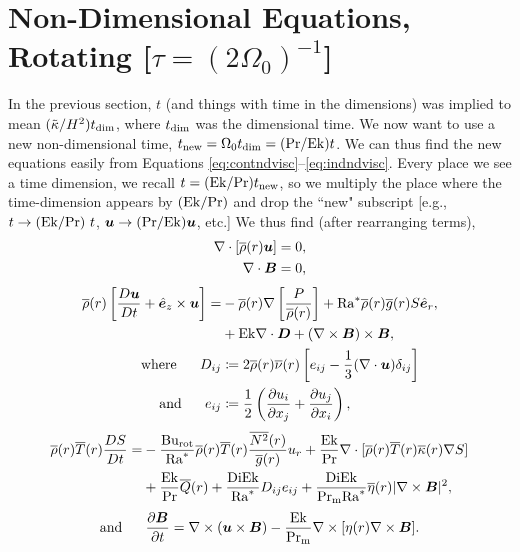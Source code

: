 \documentclass[12pt]{article}
\numberwithin{equation}{section}
\begin{document}
\section{Non-Dimensional Equations, Rotating [$\tau=(2\Omega_0)^{-1}$]}
In the previous section, $t$ (and things with time in the dimensions) was implied to mean $(\tilde{\kappa}/H^2) t_{\rm{dim}}$, where $t_{\rm{dim}}$ was the dimensional time. We now want to use a new non-dimensional time, $t_{\rm{new}}= \Omega_0t_{\rm{dim}} = ({\rm{Pr}}/{\rm{Ek}})t$. We can thus find the new equations easily from Equations \eqref{eq:contndvisc}--\eqref{eq:indndvisc}. Every place we see a time dimension, we recall $t=({\rm{Ek}} /{\rm{Pr}})t_{\rm{new}}$, so we multiply the place where the time-dimension appears by $({\rm{Ek}}/{\rm{Pr}})$ and drop the ``new" subscript [e.g., $t\rightarrow ({\rm{Ek}}/{\rm{Pr}})\ t$, $\bm{u}\rightarrow({\rm{Pr}}/{\rm{Ek}})\bm{u}$, etc.]  We thus find (after rearranging terms),
\begin{align}
	\nabla\cdot[\overline{\rho}(r)\bm{u}] &= 0\label{eq:contndrot},\\
	\nabla\cdot \bm{B} &= 0,
\end{align}
\begin{subequations}\label{eq:momndrot}
	\begin{align}
		\overline{\rho}(r)\left[\frac{D\bm{u}}{Dt} + \hat{\bm{e}}_z\times\bm{u}\right] = &-\overline{\rho}(r)\nabla\left[ \frac{P}{\overline{\rho}(r)} \right] + {\rm{Ra}}^* \overline{\rho}(r)\overline{g}(r) S\hat{\bm{e}}_r, \nonumber\\
		&+ {\rm{Ek}} \nabla\cdot\bm{D} +(\nabla\times\bm{B})\times\bm{B},\\
		\text{where}\ \ \ \ \  D_{ij} &\coloneqq 2\overline{\rho}(r)\overline{\nu}(r) \left[e_{ij} - \frac{1}{3}(\nabla\cdot\bm{u}) \delta_{ij} \right]\\
		\text{and}\ \ \ \ \  e_{ij} &\coloneqq \frac{1}{2}\left(\frac{\partial u_i}{\partial x_j} + \frac{\partial u_j}{\partial x_i} \right),
	\end{align}
\end{subequations}
\begin{align}\label{eq:enndrot}
	\overline{\rho}(r)\overline{T}(r) \frac{DS}{Dt} = &- \frac{{\rm{Bu_{rot}}}}{{\rm{Ra}}^*} \overline{\rho}(r)\overline{T}(r) \frac{\overline{N^2}(r)}{\overline{g}(r)} u_r + \frac{{\rm{Ek}}}{{\rm{Pr}}} \nabla\cdot[\overline{\rho}(r) \overline{T}(r) \overline{\kappa}(r) \nabla S] \nonumber \\
	&+ \frac{{\rm{Ek}}}{{\rm{Pr}}} \overline{Q}(r) + \frac{{\rm{Di}}{\rm{Ek}}}{{\rm{Ra}}^*} D_{ij}e_{ij} + \frac{{\rm{Di}}{\rm{Ek}}}{{\rm{Pr_m}}{\rm{Ra}}^*} \overline{\eta}(r)|\nabla\times\bm{B}|^2,
\end{align}
\begin{align}\label{eq:indndrot}
	\text{and}\ \ \ \ \  \frac{\partial\bm{B}}{\partial t} = \nabla\times(\bm{u}\times\bm{B}) - \frac{{\rm{Ek}}}{{\rm{Pr_m}}} \nabla\times[\eta(r)\nabla\times\bm{B}].
\end{align}	
\end{document}
